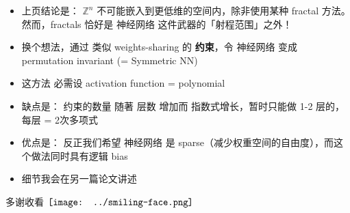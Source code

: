 \documentclass[15pt]{beamer}
\newcommand{\cc}[2]{#1}
\newcommand{\cc}[2]{#2}
\newcommand{\emp}[1]{{\color{violet}#1}}
\newcommand{\red}[1]{{\color{red}#1}}
\renewcommand{\smiley}{$\vcenter{\hbox{\texttt{[image: ../smiling-face.png]}}}$}
\begin{document}
\begin{frame}[plain]
\begin{itemize}
	\item \cc{
	上页结论是： $\mathbb{Z}^n$ 不可能嵌入到更低维的空间内，除非使用某种 \red{fractal} 方法。  然而，fractals 恰好是 神经网络 这件武器的「射程范围」之外！ }{
	Seems that $\mathbb{Z}^n$ cannot be embedded into lower dimensions, unless we use some kind of \emp{fractal} structure.  However, fractals are exactly the realm that is out-of-reach of the universal approximating power of neural networks!
	}
	
	\item \cc{
	换个想法，通过 类似 weights-sharing 的 \textbf{约束}，令 神经网络 变成 permutation invariant (= \red{Symmetric NN})}{
	Another strategy is to create \emp{symmetric} neural networks whose output is invariant when the input is permuted.  This could be achieved by ``weight-sharing''.
	}
	
	
	\item \cc{
	这方法 必需设 activation function = polynomial}{
	For this to work, the activation function must be \emp{polynomials}.
	}
	
	\item \cc{
	缺点是： 约束的数量 随著 层数 增加而 指数式增长，暂时只能做 1-2 层的，每层 = 2次多项式}{
	A drawback of this approach is when \# layers grow, \# constraints also grow exponentially, making it hard to build deep (many-layer) networks
	}

	\item \cc{
	优点是： 反正我们希望 神经网络 是 sparse（减少权重空间的自由度），而这个做法同时具有逻辑 bias}{
	An advantage is that the resulting NN is very sparse in terms of \# weights.  This is a form of inductive bias.
	}
	
	\item \cc{
	细节我会在另一篇论文讲述}{
	As of this writing, I am yet exploring another approach that is inspired by Google's BERT.  More on this later.
	}

\end{itemize}
\printbibliography
\begin{center}
	\cc{多谢收看}{Thanks for watching} \smiley
\end{center}
\end{frame}
\end{document}
